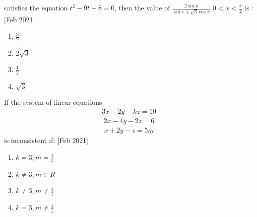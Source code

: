 satisfies the equation $t^2-9t+8=0$, then the value of $\frac{2\sin{x}}{\sin{x}+\sqrt{3}\cos{x}}$ $0<x<\frac{\pi}{2}$ is : \hfill[Feb 2021]
\begin{multicols}{2}
\begin{enumerate}
    \item $\frac{3}{2}$
    \item $2\sqrt{3}$
    \item $\frac{1}{2}$
    \item $\sqrt{3}$
\end{enumerate}
\end{multicols}
\item If the system of linear equations
\begin{align*}
    3x-2y-kz=10
\end{align*}
\begin{align*}
    2x-4y-2z=6
\end{align*}
\begin{align*}
    x+2y-z=5m
\end{align*}
is inconsistent if: \hfill[Feb 2021]
\begin{multicols}{2}
\begin{enumerate}
    \item $k=3,m=\frac{4}{5}$
    \item $k\neq3,m\in R$
    \item $k\neq3,m\neq \frac{4}{5}$
    \item $k=3,m\neq \frac{4}{5}$
\end{enumerate}
\end{multicols}

